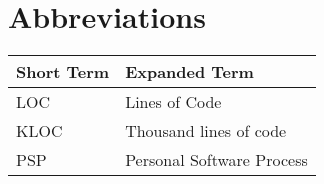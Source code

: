\chapter{Abbreviations}




\begin{tabular}{p{40mm}|p{100mm}}
	\textbf{Short Term}&\textbf{Expanded Term}\\
	\hline
	LOC		&	Lines of Code\\
	KLOC	&	Thousand lines of code\\
	PSP		& 	Personal Software Process\\
\end{tabular}
